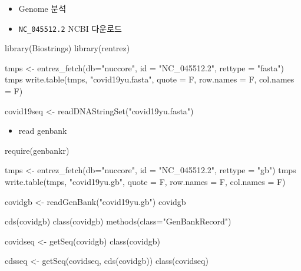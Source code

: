 \documentclass[
]{book}
\newenvironment{Shaded}{\begin{snugshade}}{\end{snugshade}}
\newcommand{\AttributeTok}[1]{\textcolor[rgb]{0.77,0.63,0.00}{#1}}
\newcommand{\FunctionTok}[1]{\textcolor[rgb]{0.00,0.00,0.00}{#1}}
\newcommand{\NormalTok}[1]{#1}
\newcommand{\OtherTok}[1]{\textcolor[rgb]{0.56,0.35,0.01}{#1}}
\newcommand{\StringTok}[1]{\textcolor[rgb]{0.31,0.60,0.02}{#1}}
\providecommand{\tightlist}{%
  \setlength{\itemsep}{0pt}\setlength{\parskip}{0pt}}
\begin{document}
\begin{itemize}
\tightlist
\item
  Genome 분석\\
\item
  \texttt{NC\_045512.2} NCBI 다운로드
\end{itemize}

\begin{Shaded}
\begin{Highlighting}[]
\FunctionTok{library}\NormalTok{(Biostrings)}
\FunctionTok{library}\NormalTok{(rentrez)}


\NormalTok{tmps }\OtherTok{\textless{}{-}} \FunctionTok{entrez\_fetch}\NormalTok{(}\AttributeTok{db=}\StringTok{"nuccore"}\NormalTok{, }\AttributeTok{id =} \StringTok{"NC\_045512.2"}\NormalTok{, }\AttributeTok{rettype =} \StringTok{"fasta"}\NormalTok{)}
\NormalTok{tmps}
\FunctionTok{write.table}\NormalTok{(tmps, }\StringTok{"covid19yu.fasta"}\NormalTok{, }\AttributeTok{quote =}\NormalTok{ F, }\AttributeTok{row.names =}\NormalTok{ F, }\AttributeTok{col.names =}\NormalTok{ F)}

\NormalTok{covid19seq }\OtherTok{\textless{}{-}} \FunctionTok{readDNAStringSet}\NormalTok{(}\StringTok{"covid19yu.fasta"}\NormalTok{)}
\end{Highlighting}
\end{Shaded}

\begin{itemize}
\tightlist
\item
  read genbank
\end{itemize}

\begin{Shaded}
\begin{Highlighting}[]
\FunctionTok{require}\NormalTok{(genbankr)}

\NormalTok{tmps }\OtherTok{\textless{}{-}} \FunctionTok{entrez\_fetch}\NormalTok{(}\AttributeTok{db=}\StringTok{"nuccore"}\NormalTok{, }\AttributeTok{id =} \StringTok{"NC\_045512.2"}\NormalTok{, }\AttributeTok{rettype =} \StringTok{"gb"}\NormalTok{)}
\NormalTok{tmps}
\FunctionTok{write.table}\NormalTok{(tmps, }\StringTok{"covid19yu.gb"}\NormalTok{, }\AttributeTok{quote =}\NormalTok{ F, }\AttributeTok{row.names =}\NormalTok{ F, }\AttributeTok{col.names =}\NormalTok{ F)}

\NormalTok{covidgb }\OtherTok{\textless{}{-}} \FunctionTok{readGenBank}\NormalTok{(}\StringTok{"covid19yu.gb"}\NormalTok{)}
\NormalTok{covidgb}

\FunctionTok{cds}\NormalTok{(covidgb)}
\FunctionTok{class}\NormalTok{(covidgb)}
\FunctionTok{methods}\NormalTok{(}\AttributeTok{class=}\StringTok{"GenBankRecord"}\NormalTok{)}

\NormalTok{covidseq }\OtherTok{\textless{}{-}} \FunctionTok{getSeq}\NormalTok{(covidgb)}
\FunctionTok{class}\NormalTok{(covidgb)}

\NormalTok{cdsseq }\OtherTok{\textless{}{-}} \FunctionTok{getSeq}\NormalTok{(covidseq, }\FunctionTok{cds}\NormalTok{(covidgb))}
\FunctionTok{class}\NormalTok{(covidseq)}
\end{Highlighting}
\end{Shaded}
\end{document}
